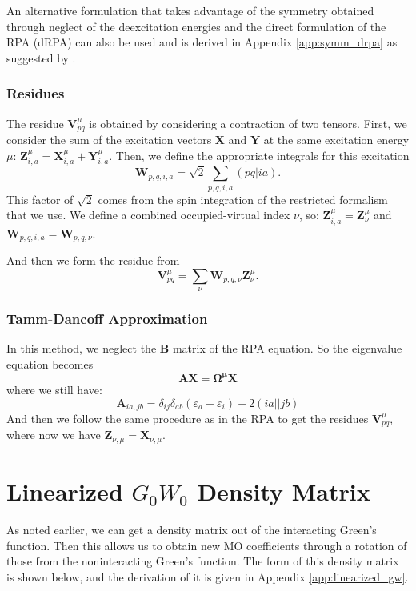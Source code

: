 \documentclass[12pt]{caltech_thesis}
\begin{document}
An alternative formulation that takes advantage of the symmetry obtained through neglect of the deexcitation energies and the direct formulation of the RPA (dRPA) can also be used and is derived in Appendix \ref{app:symm_drpa} as suggested by \textcite{furche_density_2001}.
\subsection{Residues}

The residue $\textbf{V}^{\mu}_{pq}$ is obtained by considering a contraction of two tensors. First, we consider the sum of the excitation vectors $\textbf{X}$ and $\textbf{Y}$ at the same excitation energy $\mu$: $\textbf{Z}_{i,a}^{\mu} = \textbf{X}_{i,a}^{\mu} + \textbf{Y}_{i,a}^{\mu}$. Then, we define the appropriate integrals for this excitation
\begin{equation}
    \textbf{W}_{p,q,i,a} = \sqrt{2} \sum_{p,q,i,a} (pq|ia).
\end{equation}
This factor of $\sqrt{2}$ comes from the spin integration of the restricted formalism that we use.
We define a combined occupied-virtual index $\nu$, so: $\textbf{Z}_{i,a}^{\mu} = \textbf{Z}_{\nu}^{\mu}$ and $\textbf{W}_{p,q,i,a} = \textbf{W}_{p,q,\nu}$.

And then we form the residue from
\begin{equation}
    \textbf{V}_{pq}^{\mu} = \sum_{\nu} \textbf{W}_{p,q,\nu} \textbf{Z}_{\nu}^{\mu}.
\end{equation}

\subsection{Tamm-Dancoff Approximation}
In this method, we neglect the $\textbf{B}$ matrix of the RPA equation. So the eigenvalue equation becomes
\begin{equation}
    \textbf{A}\textbf{X} = \boldsymbol{\Omega ^{\mu}} \textbf{X}
\end{equation}
where we still have:
\begin{equation}
    \textbf{A}_{ia,jb} = \delta _{ij}\delta _{ab}(\varepsilon _{a}- \varepsilon _{i}) + 2(ia||jb)
\label{eq: A matrix TDA}
\end{equation}
And then we follow the same procedure as in the RPA to get the residues $\textbf{V}_{pq}^{\mu}$, where now we have $\textbf{Z}_{\nu, \mu} = \textbf{X}_{\nu, \mu}$.

\chapter{Linearized $G_0W_0$ Density Matrix}
As noted earlier, we can get a density matrix out of the interacting Green's function. Then this allows us to obtain new MO coefficients through a rotation of those from the noninteracting Green's function. The form of this density matrix is shown below, and the derivation of it is given in Appendix \ref{app:linearized_gw}.
\label{chap:linearized_gw}
\end{document}

